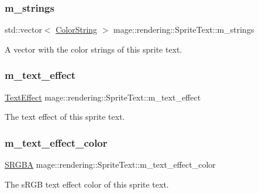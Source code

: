 \subsubsection{\texorpdfstring{m\+\_\+strings}{m\_strings}}
{\footnotesize\ttfamily std\+::vector$<$ \hyperlink{classmage_1_1rendering_1_1_color_string}{Color\+String} $>$ mage\+::rendering\+::\+Sprite\+Text\+::m\+\_\+strings\hspace{0.3cm}{\ttfamily [private]}}

A vector with the color strings of this sprite text. \hypertarget{classmage_1_1rendering_1_1_sprite_text_a795a35dc3671097dd29afaa4b2c5ac3a}{}\label{classmage_1_1rendering_1_1_sprite_text_a795a35dc3671097dd29afaa4b2c5ac3a} 
\subsubsection{\texorpdfstring{m\+\_\+text\+\_\+effect}{m\_text\_effect}}
{\footnotesize\ttfamily \hyperlink{classmage_1_1rendering_1_1_sprite_text_af07ecf28d2ab8997c011cab74e799ef7}{Text\+Effect} mage\+::rendering\+::\+Sprite\+Text\+::m\+\_\+text\+\_\+effect\hspace{0.3cm}{\ttfamily [private]}}

The text effect of this sprite text. \hypertarget{classmage_1_1rendering_1_1_sprite_text_afa9c4b4bd748570ce67d8fe57ce86026}{}\label{classmage_1_1rendering_1_1_sprite_text_afa9c4b4bd748570ce67d8fe57ce86026} 
\subsubsection{\texorpdfstring{m\+\_\+text\+\_\+effect\+\_\+color}{m\_text\_effect\_color}}
{\footnotesize\ttfamily \hyperlink{structmage_1_1_s_r_g_b_a}{S\+R\+G\+BA} mage\+::rendering\+::\+Sprite\+Text\+::m\+\_\+text\+\_\+effect\+\_\+color\hspace{0.3cm}{\ttfamily [private]}}

The s\+R\+GB text effect color of this sprite text. 